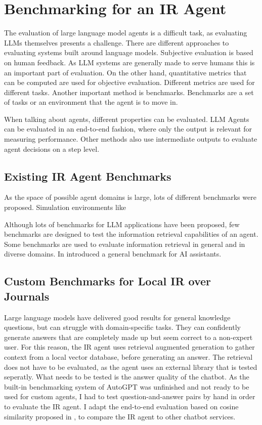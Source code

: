 \documentclass[../main.tex]{subfiles}
\begin{document}
\chapter{Benchmarking for an IR Agent}
\label{ch:benchmarks}

The evaluation of large language model agents is a difficult task,
as evaluating LLMs themselves presents a challenge.
There are different approaches to evaluating systems built around language models.
Subjective evaluation is based on human feedback.
As LLM systems are generally made to serve humans this is an important part of evaluation.
On the other hand,
quantitative metrics that can be computed are used for objective evaluation.
Different metrics are used for different tasks. Another important method is benchmarks.
Benchmarks are a set of tasks or an environment that the agent is to move in.

When talking about agents, different properties can be evaluated.
LLM Agents can be evaluated in an end-to-end fashion, where only the output is
relevant for measuring performance.
Other methods also use intermediate outputs to evaluate agent decisions on a step level.

\section{Existing IR Agent Benchmarks}

As the space of possible agent domains is large, lots of different benchmarks were proposed.
Simulation environments like

Although lots of benchmarks for LLM applications have been proposed,
few benchmarks are designed to test the information retrieval capabilities of an agent.
Some benchmarks are used to evaluate information retrieval in general and in diverse domains. %
In \autocite{Mialon2023} introduced a general benchmark for AI assistants.

\section{Custom Benchmarks for Local IR over Journals}

Large language models have delivered good results for general knowledge questions,
but can struggle with domain-specific tasks.
They can confidently generate answers that are completely made up but seem correct to a non-expert user.
For this reason, the IR agent uses retrieval augmented generation to gather context from a local vector database,
before generating an answer.
The retrieval does not have to be evaluated, as the agent uses an external library that is tested seperatly.
What needs to be tested is the answer quality of the chatbot.
As the built-in benchmarking system of AutoGPT was unfinished and not ready to be used for custom agents,
I had to test question-and-answer pairs by hand in order to evaluate the IR agent.
I adapt the end-to-end evaluation based on cosine similarity proposed in \cite{Banerjee2023},
to compare the IR agent to other chatbot services.
\end{document}
